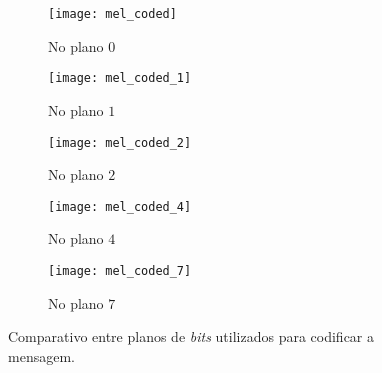 \documentclass[brazilian,a4paper,twocolumn]{article}
\begin{document}
        \begin{figure*}
            \centering
            \begin{subfigure}{0.18\textwidth}
                \texttt{[image: mel\_coded]}
                \caption{No plano $0$}
            \end{subfigure}
            \hfill
            \begin{subfigure}{0.18\textwidth}
                \texttt{[image: mel\_coded\_1]}
                \caption{No plano $1$}
            \end{subfigure}
            \hfill
            \begin{subfigure}{0.18\textwidth}
                \texttt{[image: mel\_coded\_2]}
                \caption{No plano $2$}
            \end{subfigure}
            \hfill
            \begin{subfigure}{0.18\textwidth}
                \texttt{[image: mel\_coded\_4]}
                \caption{No plano $4$}
            \end{subfigure}
            \hfill
            \begin{subfigure}{0.18\textwidth}
                \texttt{[image: mel\_coded\_7]}
                \caption{No plano $7$}
                \label{fig:comparativo-plano-7}
            \end{subfigure}

            \caption{Comparativo entre planos de \textit{bits} utilizados para codificar a mensagem.}
            \label{fig:comparativo-planos}
        \end{figure*}
\end{document}
